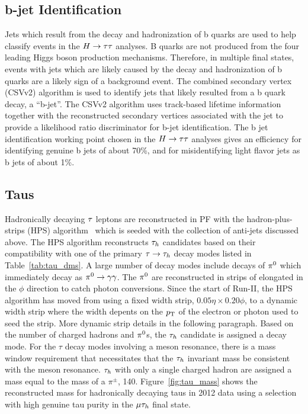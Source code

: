 \subsection{b-jet Identification}
Jets which result from the decay and hadronization of b quarks are used to help classify events
in the $H\to\tau\tau$ analyses. B quarks are not produced from the four leading Higgs boson production
mechanisms. Therefore, in multiple final states, events with jets which are likely caused by the decay and
hadronization of b quarks are a likely sign of a background event.
The combined secondary vertex (CSVv2) algorithm is used to identify jets that likely resulted
from a b quark decay, a ``b-jet''. The CSVv2 algorithm uses track-based lifetime information together with 
the reconstructed secondary vertices associated with the jet to provide a likelihood ratio 
discriminator for b-jet identification. The b jet identification working point chosen in the $H\to\tau\tau$ analyses 
gives an efficiency for identifying genuine b jets of about 70\%, and for misidentifying light flavor jets
as b jets of about 1\%.


\subsection{Taus}
Hadronically decaying $\tau$ leptons are reconstructed in PF with the hadron-plus-strips (HPS)
algorithm~\cite{Khachatryan:2015dfa, CMS-PAS-TAU-16-002} which is seeded with the collection of 
anti-\kt jets discussed above. The HPS algorithm reconstructs $\tau_{h}$ candidates based on their
compatibility with one of the primary $\tau\to\tau_{h}$ decay modes listed in Table~\ref{tab:tau_dms}.
A large number of decay modes include decays of $\pi^{0}$ which immediately decay as 
$\pi^{0}  \to  \gamma\gamma$. The $\pi^{0}$ are
reconstructed in strips of \etaphi elongated in the $\phi$ direction to catch photon conversions.
Since the start of Run-II, the HPS algorithm has moved from using a fixed width strip,
$0.05 \eta \times 0.20 \phi$, to a dynamic width strip where the width depents on the 
$p_\mathrm{T}$ of the electron or photon used to seed the strip. More dynamic strip details in the following paragraph.
Based on the number of
charged hadrons and $\pi^{0}$s, the $\tau_{h}$ candidate is assigned a decay mode. For the $\tau$
decay modes involving a meson resonance, there is a mass window requirement that necessitates
that the $\tau_{h}$ invariant mass be consistent with the meson resonance. $\tau_{h}$ with only a single
charged hadron are assigned a mass equal to the mass of a $\pi^{\pm}$, 140\MeV. Figure~\ref{fig:tau_mass}
shows the reconstructed mass for hadronically decaying taus in 2012 data using a selection with
high genuine tau purity in the $\mu\tau_{h}$ final state.


